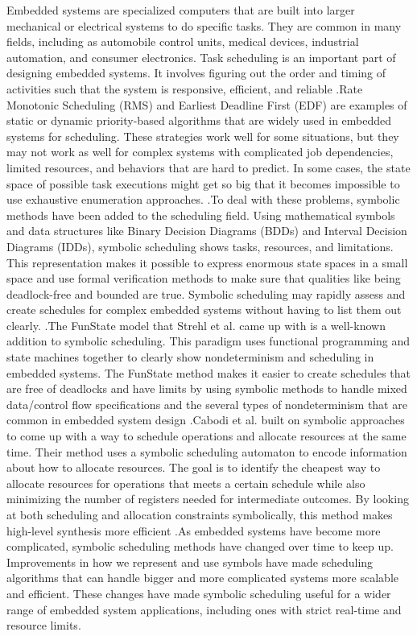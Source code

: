 \documentclass[conference]{IEEEtran}
\begin{document}
 Embedded systems are specialized computers that are built into larger mechanical or electrical systems to do specific tasks.  They are common in many fields, including as automobile control units, medical devices, industrial automation, and consumer electronics.  Task scheduling is an important part of designing embedded systems. It involves figuring out the order and timing of activities such that the system is responsive, efficient, and reliable \cite{strehl1999scheduling}.Rate Monotonic Scheduling (RMS) and Earliest Deadline First (EDF) are examples of static or dynamic priority-based algorithms that are widely used in embedded systems for scheduling.  These strategies work well for some situations, but they may not work as well for complex systems with complicated job dependencies, limited resources, and behaviors that are hard to predict.  In some cases, the state space of possible task executions might get so big that it becomes impossible to use exhaustive enumeration approaches. \cite{radivojevic1996symbolic}.To deal with these problems, symbolic methods have been added to the scheduling field.  Using mathematical symbols and data structures like Binary Decision Diagrams (BDDs) and Interval Decision Diagrams (IDDs), symbolic scheduling shows tasks, resources, and limitations.  This representation makes it possible to express enormous state spaces in a small space and use formal verification methods to make sure that qualities like being deadlock-free and bounded are true.  Symbolic scheduling may rapidly assess and create schedules for complex embedded systems without having to list them out clearly. \cite{strehl1999scheduling}.The FunState model that Strehl et al. came up with is a well-known addition to symbolic scheduling.  This paradigm uses functional programming and state machines together to clearly show nondeterminism and scheduling in embedded systems.  The FunState method makes it easier to create schedules that are free of deadlocks and have limits by using symbolic methods to handle mixed data/control flow specifications and the several types of nondeterminism that are common in embedded system design \cite{strehl1999scheduling}.Cabodi et al. built on symbolic approaches to come up with a way to schedule operations and allocate resources at the same time.  Their method uses a symbolic scheduling automaton to encode information about how to allocate resources. The goal is to identify the cheapest way to allocate resources for operations that meets a certain schedule while also minimizing the number of registers needed for intermediate outcomes.  By looking at both scheduling and allocation constraints symbolically, this method makes high-level synthesis more efficient \cite{cabodi2002symbolic}.As embedded systems have become more complicated, symbolic scheduling methods have changed over time to keep up.  Improvements in how we represent and use symbols have made scheduling algorithms that can handle bigger and more complicated systems more scalable and efficient.  These changes have made symbolic scheduling useful for a wider range of embedded system applications, including ones with strict real-time and resource limits.
\end{document}
